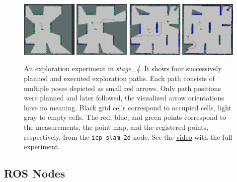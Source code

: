 \documentclass[a4paper]{article}
\newcommand{\file}[1]{\texttt{#1}}
\begin{document}
\begin{figure}[tb]
\centering
\includegraphics[width=0.24\textwidth]{exploration-stage_4-00080}%
\includegraphics[width=0.24\textwidth]{exploration-stage_4-00218}%
\includegraphics[width=0.24\textwidth]{exploration-stage_4-00485}%
\includegraphics[width=0.24\textwidth]{exploration-stage_4-00830}%
\caption{An exploration experiment in \emph{stage\_4}.
It shows four successively planned and executed exploration paths.
Each path consists of multiple poses depicted as small red arrows.
Only path positions were planned and later followed, the visualized arrow orientations have no meaning.
Black grid cells correspond to occupied cells, light gray to empty cells.
The red, blue, and green points correspond to the measurements, the point map, and the registered points, respectively, from the \file{icp_slam_2d} node.
See the \href{https://cw.fel.cvut.cz/b192/_media/courses/aro/tutorials/exploration-stage_4.ogv}{video} with the full experiment.
}
\label{fig:exploration}
\end{figure}

\subsection{ROS Nodes}
\end{document}
